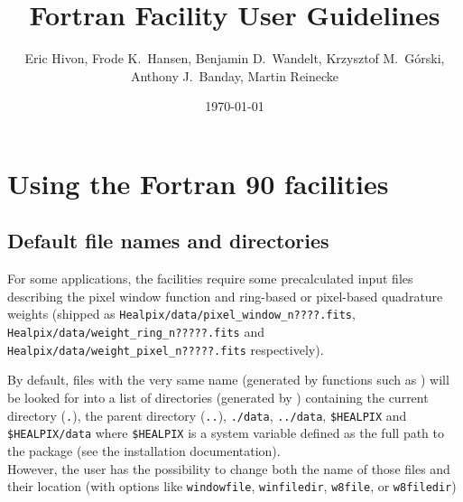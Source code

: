 \documentclass[12pt,twoside]{article}
\begin{document}
\title{\healpix Fortran Facility User Guidelines}
\label{fac:facilities}
\author{Eric Hivon, Frode K.~Hansen, Benjamin D.~Wandelt, Krzysztof M.~G\'orski,
Anthony J.~Banday, Martin Reinecke}

\date{\today}

\frontpage
\tableofcontents
\newpage

\section{Using the \healpix Fortran 90 facilities}
\subsection{Default file names and directories}
\label{fac:subsec:defdir}
For some applications, the \healpix facilities
require some precalculated input files describing the pixel window
function and ring-based or pixel-based quadrature weights (shipped as 
{\tt Healpix/data/pixel\_\-window\_\-n????.fits},
{\tt Healpix/data/weight\_\-ring\_\-n?????.fits} and
{\tt Healpix/data/weight\_\-pixel\_\-n?????.fits} respectively). \label{page:defdir}

By default, files with the very same name (generated by functions such as 
) 
will be looked for into a list of directories (generated by 
) 
containing the current directory (\texttt{.}), the parent directory (\texttt{..}),
\texttt{./data}, \texttt{../data}, \texttt{\$HEALPIX} and \texttt{\$HEALPIX/data} where \texttt{\$HEALPIX} is
a system variable defined as the full path to the \healpix package
(see the installation documentation).\\
However, the user has the possibility to change both the name of those files
and their location (with options like 
\texttt{windowfile},
\texttt{winfiledir},
\texttt{w8file}, or
\texttt{w8filedir})
\end{document}
